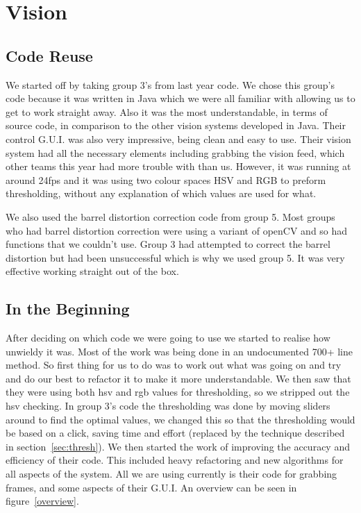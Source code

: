\section{Vision}

\subsection{Code Reuse}

We started off by taking group 3's from last year code.  We chose this group's code because it was written in Java which we were all familiar with allowing us to get to work straight away. Also it was the most understandable, in terms of source code, in comparison to the other vision systems developed in Java.  Their control G.U.I. was also very impressive, being clean and easy to use.  Their vision system had all the necessary elements including grabbing the vision feed, which other teams this year had more trouble with than us.  However, it was running at around 24fps and it was using two colour spaces HSV and RGB to preform thresholding, without any explanation of which values are used for what. 

We also used the barrel distortion correction code from group 5.  Most groups who had barrel distortion correction were using a variant of openCV and so had functions that we couldn't use.  Group 3 had attempted to correct the barrel distortion but had been unsuccessful which is why we used group 5.  It was very effective working straight out of the box.

\subsection{In the Beginning}

After deciding on which code we were going to use we started to realise how unwieldy it was.  Most of the work was being done in an undocumented 700+ line method.  So first thing for us to do was to work out what was going on and try and do our best to refactor it to make it more understandable.  We then saw that they were using both hsv and rgb values for thresholding, so we stripped out the hsv checking.  In group 3's code the thresholding was done by moving sliders around to find the optimal values, we changed this so that the thresholding would be based on a click, saving time and effort (replaced by the technique described in section~\ref{sec:thresh}).  We then started the work of improving the accuracy and efficiency of their code.  This included heavy refactoring and new algorithms for all aspects of the system.  All we are using currently is their code for grabbing frames, and some aspects of their G.U.I. An overview can be seen in figure~\ref{overview}.


